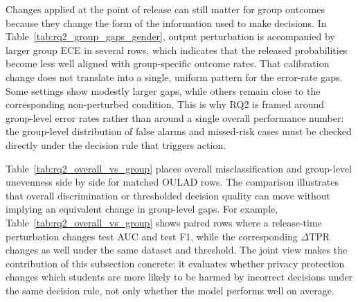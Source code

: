 \documentclass{edm_article}
\begin{document}
Changes applied at the point of release can still matter for group outcomes because they change the form of the information used to make decisions. In Table~\ref{tab:rq2_group_gaps_gender}, output perturbation is accompanied by larger group ECE in several rows, which indicates that the released probabilities become less well aligned with group-specific outcome rates. That calibration change does not translate into a single, uniform pattern for the error-rate gaps. Some settings show modestly larger gaps, while others remain close to the corresponding non-perturbed condition. This is why RQ2 is framed around group-level error rates rather than around a single overall performance number: the group-level distribution of false alarms and missed-risk cases must be checked directly under the decision rule that triggers action.

Table~\ref{tab:rq2_overall_vs_group} places overall misclassification and group-level unevenness side by side for matched OULAD rows. The comparison illustrates that overall discrimination or thresholded decision quality can move without implying an equivalent change in group-level gaps. For example, Table~\ref{tab:rq2_overall_vs_group} shows paired rows where a release-time perturbation changes test AUC and test F1, while the corresponding $\Delta\mathrm{TPR}$ changes as well under the same dataset and threshold. The joint view makes the contribution of this subsection concrete: it evaluates whether privacy protection changes which students are more likely to be harmed by incorrect decisions under the same decision rule, not only whether the model performs well on average.
\end{document}
